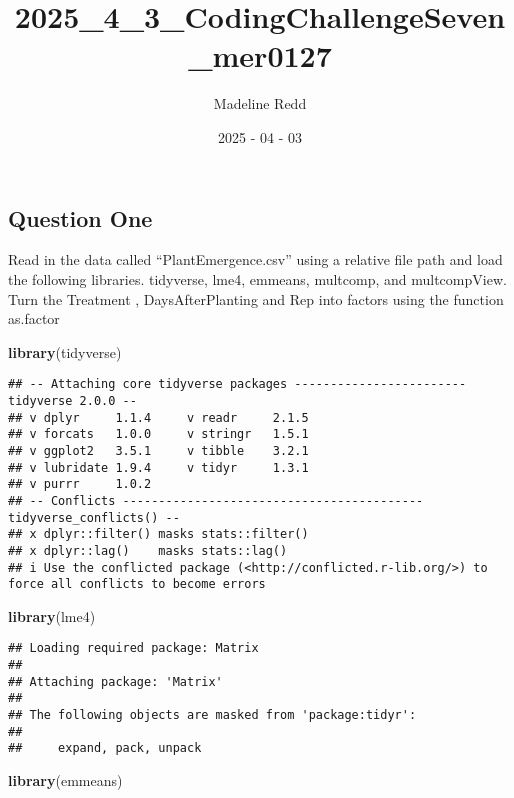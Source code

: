 \documentclass[
  12pt,
]{article}
\title{2025\_4\_3\_CodingChallengeSeven\_mer0127}
\author{Madeline Redd}
\date{2025 - 04 - 03}
\newenvironment{Shaded}{\begin{snugshade}}{\end{snugshade}}
\newcommand{\FunctionTok}[1]{\textcolor[rgb]{0.13,0.29,0.53}{\textbf{#1}}}
\newcommand{\NormalTok}[1]{#1}
\begin{document}
\maketitle

\subsection{Question One}\label{question-one}

Read in the data called ``PlantEmergence.csv'' using a relative file
path and load the following libraries. tidyverse, lme4, emmeans,
multcomp, and multcompView. Turn the Treatment , DaysAfterPlanting and
Rep into factors using the function as.factor

\begin{Shaded}
\begin{Highlighting}[]
\FunctionTok{library}\NormalTok{(tidyverse)}
\end{Highlighting}
\end{Shaded}

\begin{verbatim}
## -- Attaching core tidyverse packages ------------------------ tidyverse 2.0.0 --
## v dplyr     1.1.4     v readr     2.1.5
## v forcats   1.0.0     v stringr   1.5.1
## v ggplot2   3.5.1     v tibble    3.2.1
## v lubridate 1.9.4     v tidyr     1.3.1
## v purrr     1.0.2     
## -- Conflicts ------------------------------------------ tidyverse_conflicts() --
## x dplyr::filter() masks stats::filter()
## x dplyr::lag()    masks stats::lag()
## i Use the conflicted package (<http://conflicted.r-lib.org/>) to force all conflicts to become errors
\end{verbatim}

\begin{Shaded}
\begin{Highlighting}[]
\FunctionTok{library}\NormalTok{(lme4)}
\end{Highlighting}
\end{Shaded}

\begin{verbatim}
## Loading required package: Matrix
## 
## Attaching package: 'Matrix'
## 
## The following objects are masked from 'package:tidyr':
## 
##     expand, pack, unpack
\end{verbatim}

\begin{Shaded}
\begin{Highlighting}[]
\FunctionTok{library}\NormalTok{(emmeans)}
\end{Highlighting}
\end{Shaded}
\end{document}
